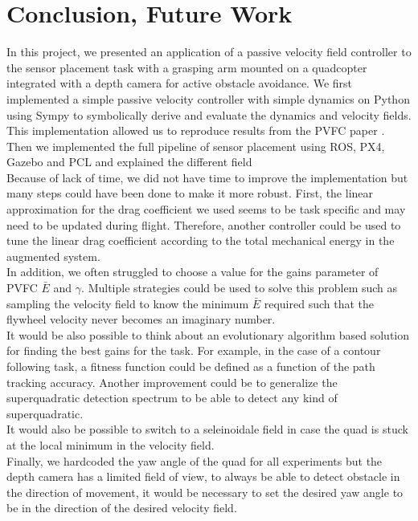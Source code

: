 \section{Conclusion, Future Work}
In this project, we presented an application of a passive velocity field controller to the sensor placement task with a grasping arm mounted on a quadcopter integrated with a depth camera for active obstacle avoidance. 
We first implemented a simple passive velocity controller with simple dynamics on Python using Sympy to symbolically derive and evaluate the dynamics and velocity fields. 
This implementation allowed us to reproduce results from the PVFC paper \cite{li1999passive}.
Then we implemented the full pipeline of sensor placement using ROS, PX4, Gazebo and PCL and explained the different field\\

Because of lack of time, we did not have time to improve the implementation but many steps could have been done to make it more robust.
First, the linear approximation for the drag coefficient we used seems to be task specific and may need to be updated during flight. Therefore, another controller could be used to tune the linear drag coefficient 
according to the total mechanical energy in the augmented system.\\
In addition, we often struggled to choose a value for the gains parameter of PVFC $\bar{E}$ and $\gamma$. Multiple strategies could be used to solve this problem such as sampling the velocity field to know the minimum $\bar{E}$ required 
such that the flywheel velocity never becomes an imaginary number. \\
It would be also possible to think about an evolutionary algorithm based solution for finding the best gains for the task. For example, in the case of a contour following task, a fitness function could be defined as a function of the path tracking accuracy.
Another improvement could be to generalize the superquadratic detection spectrum to be able to detect any kind of superquadratic.\\
It would also be possible to switch to a seleinoidale field in case the quad is stuck at the local minimum in the velocity field.\\
Finally, we hardcoded the yaw angle of the quad for all experiments but the depth camera has a limited field of view, to always be able to detect obstacle in the direction of movement, it would be necessary to set the desired yaw angle to be in the direction of the desired velocity field.

